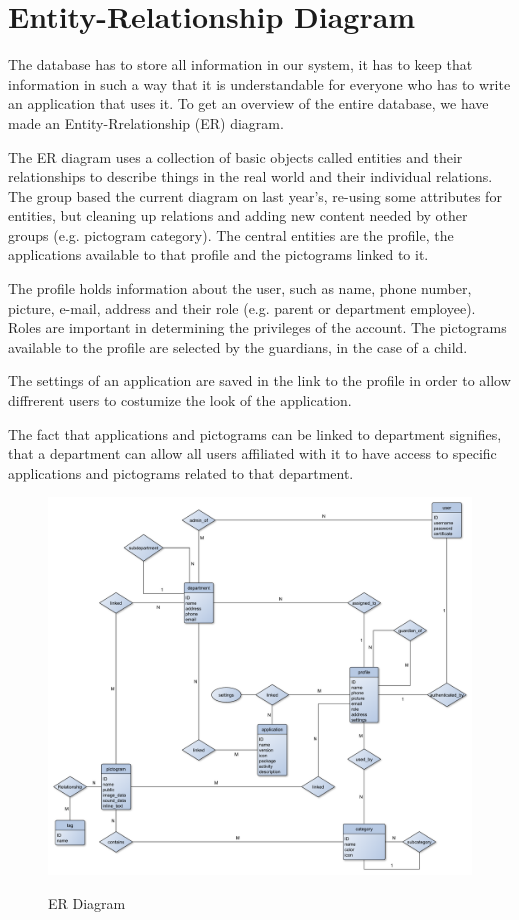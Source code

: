 \section{Entity-Relationship Diagram}
The database has to store all information in our system, it has to keep that information in such a way that it is understandable for everyone who has to write an application that uses it. To get an overview of the entire database, we have made an Entity-Rrelationship (ER) diagram.

The ER diagram uses a collection of basic objects called entities and their relationships to describe things in the real world and their individual relations. The group based the current diagram on last year's, re-using some attributes for entities, but cleaning up relations and adding new content needed by other groups (e.g. pictogram category). The central entities are the profile, the applications available to that profile and the pictograms linked to it.%

The profile holds information about the user, such as name, phone number, picture, e-mail, address and their role (e.g. parent or department employee). Roles are important in determining the privileges of the account. The pictograms available to the profile are selected by the guardians, in the case of a child.

The settings of an application are saved in the link to the profile in order to allow diffrerent users to costumize the look of the application.

The fact that applications and pictograms can be linked to department signifies, that a department can allow all users affiliated with it to have access to specific applications and pictograms related to that department.

\begin{figure}[h]
\includegraphics[width=\textwidth]{img/ER_diagram.pdf}
\label{fig:erdiagram}
\caption{ER Diagram}
\end{figure}